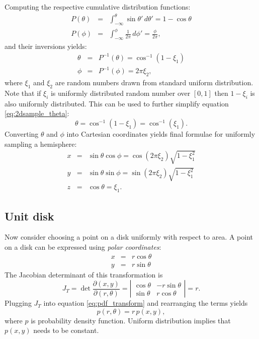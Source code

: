 Computing the respective cumulative distribution functions:
\begin{eqnarray}
  P(\theta) &=& \int_{-\infty}^{\theta} \sin\theta' \,d\theta' = 1 - \cos\theta \\
  P(\phi) &=& \int_{-\infty}^{\phi} \frac{1}{2\pi} \,d\phi' = \frac{\phi}{2\pi},
\end{eqnarray}
and their inversions yields:
\begin{eqnarray}
  \theta &=& P^{-1}(\theta) = \cos^{-1}(1 - \xi_{1}) \label{eq:2dsample_theta} \\
  \phi &=& P^{-1}(\phi) = 2\pi \xi_{2},
\end{eqnarray}
where $\xi_{1}$ and $\xi_{2}$ are random numbers drawn from standard uniform distribution. Note that if $\xi_{i}$ is uniformly distributed random number over $[0,1]$ then $1-\xi_{i}$ is also uniformly distributed. This can be used to further simplify equation \ref{eq:2dsample_theta}:
\begin{equation}
  \theta = \cos^{-1}(1-\xi_{1}) = \cos^{-1}(\xi_{1}).
\end{equation}
Converting $\theta$ and $\phi$ into Cartesian coordinates yields final formulae for uniformly sampling a hemisphere:
\begin{eqnarray}
  x &=& \sin\theta \cos\phi = \cos(2\pi \xi_{2}) \sqrt{1 - \xi_{1}^{2}} \nonumber \\
  y &=& \sin\theta \sin\phi = \sin(2\pi \xi_{2}) \sqrt{1 - \xi_{1}^{2}} \\
  z &=& \cos\theta = \xi_{1}. \nonumber
\end{eqnarray}

\subsection{Unit disk}
Now consider choosing a point on a disk uniformly with respect to area. A point on a disk can be expressed using \emph{polar coordinates}:
\begin{eqnarray}
\label{eq:polar}
  x &=& r \cos\theta \nonumber \\
  y &=& r \sin\theta
\end{eqnarray}
The Jacobian determinant of this transformation is
\begin{equation}
  J_{T} = \det \frac{\partial(x,y)}{\partial(r,\theta)} =
  \left| 
    \begin{array}{cc}
      \cos\theta & -r \sin\theta \\
      \sin\theta & r \cos\theta
    \end{array}
  \right| = r.
\end{equation}
Plugging $J_{T}$ into equation \ref{eq:pdf_transform} and rearranging the terms yields
\begin{equation}
\label{eq:pdf_disk}
  p(r, \theta) = r\,p(x, y),
\end{equation}
where $p$ is probability density function. Uniform distribution implies that $p(x,y)$ needs to be constant.

